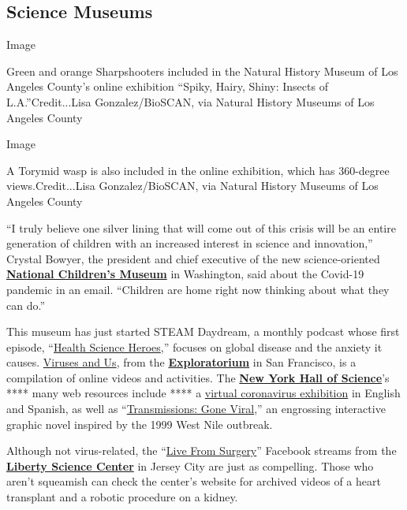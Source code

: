 \hypertarget{science-museums}{%
\subsection{Science Museums}\label{science-museums}}

Image

Green and orange Sharpshooters included in the Natural History Museum of
Los Angeles County's online exhibition ``Spiky, Hairy, Shiny: Insects of
L.A.''Credit...Lisa Gonzalez/BioSCAN, via Natural History Museums of Los
Angeles County

Image

A Torymid wasp is also included in the online exhibition, which has
360-degree views.Credit...Lisa Gonzalez/BioSCAN, via Natural History
Museums of Los Angeles County

``I truly believe one silver lining that will come out of this crisis
will be an entire generation of children with an increased interest in
science and innovation,'' Crystal Bowyer, the president and chief
executive of the new science-oriented
\textbf{\href{https://nationalchildrensmuseum.org/}{National Children's
Museum}} in Washington, said about the Covid-19 pandemic in an email.
``Children are home right now thinking about what they can do.''

This museum has just started STEAM Daydream, a monthly podcast whose
first episode,
``\href{https://nationalchildrensmuseum.org/podcast/}{Health Science
Heroes},'' focuses on global disease and the anxiety it causes.
\href{https://www.exploratorium.edu/learn}{Viruses and Us}, from the
\textbf{\href{https://www.exploratorium.edu/}{Exploratorium}} in San
Francisco, is a compilation of online videos and activities. The
\textbf{\href{https://nysci.org/}{New York Hall of Science}}'s **** many
web resources include **** a
\href{https://nysci.org/home/science-behind-coronavirus/}{virtual
coronavirus exhibition} in English and Spanish, as well as
``\href{https://nysci.org/school/resources/transmissions-gone-viral/}{Transmissions:
Gone Viral},'' an engrossing interactive graphic novel inspired by the
1999 West Nile outbreak.

Although not virus-related, the
``\href{https://lsc.org/education/lsc-in-the-house}{Live From Surgery}''
Facebook streams from the \textbf{\href{https://lsc.org/}{Liberty
Science Center}} in Jersey City are just as compelling. Those who aren't
squeamish can check the center's website for archived videos of a heart
transplant and a robotic procedure on a kidney.

